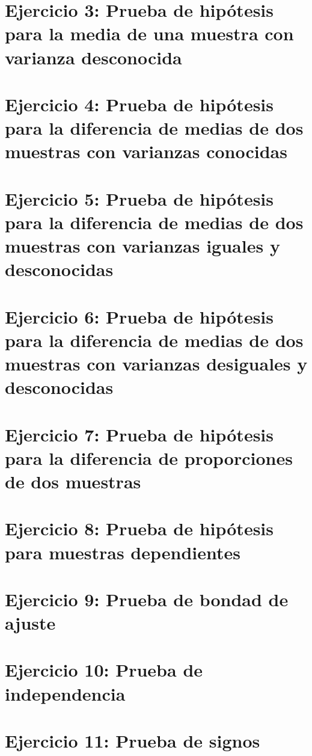 \documentclass[12pt,a4paper]{article}
\begin{document}
\section*{Ejercicio 3: Prueba de hipótesis para la media de una muestra con varianza desconocida}

\section*{Ejercicio 4: Prueba de hipótesis para la diferencia de medias de dos muestras con varianzas conocidas}

\section*{Ejercicio 5: Prueba de hipótesis para la diferencia de medias de dos muestras con varianzas iguales y desconocidas}

\section*{Ejercicio 6: Prueba de hipótesis para la diferencia de medias de dos muestras con varianzas desiguales y desconocidas}

\section*{Ejercicio 7: Prueba de hipótesis para la diferencia de proporciones de dos muestras}

\section*{Ejercicio 8: Prueba de hipótesis para muestras dependientes}

\section*{Ejercicio 9: Prueba de bondad de ajuste}

\section*{Ejercicio 10: Prueba de independencia}

\section*{Ejercicio 11: Prueba de signos}
\end{document}
